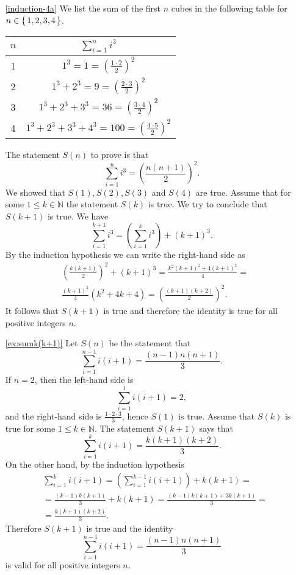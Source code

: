 \begin{enumerate}
\item[\ref{induction-4a}] We list the sum of the first $n$ cubes in the following table for $n\in\left\{\,1,2,3,4\,\right\}$. 
\begin{center}
\begin{tabular}{|c|c|}
\hline
$n$ & $\sum_{i=1}^n i^3$\\
\hline
1 & $1^3=1=\left(\frac{1\cdot 2}{2}\right)^2$\\
\hline
2 & $1^3+2^3=9=\left(\frac{2\cdot 3}{2}\right)^2$\\
\hline
3 & $1^3+2^3+3^3=36=\left(\frac{3\cdot 4}{2}\right)^2$\\
\hline
4 & $1^3+2^3+3^3+4^3=100=\left(\frac{4\cdot 5}{2}\right)^2$\\
\hline
\end{tabular}
\end{center}
The statement $S(n)$ to prove is that 
$$
\sum_{i=1}^n i^3=\left(\frac{n(n+1)}{2}\right)^2.
$$
We showed that $S(1),S(2),S(3)$ and $S(4)$ are true. Assume that for some $1\leq k\in\mathbb{N}$ the statement $S(k)$ is true. We try to conclude that $S(k+1)$ is true.
We have 
$$
\sum_{i=1}^{k+1} i^3= \left(\sum_{i=1}^{k} i^3\right)+(k+1)^3.
$$
By the induction hypothesis we can write the right-hand side as
\begin{align*}
& \left(\frac{k(k+1)}{2}\right)^2+(k+1)^3=\frac{k^2(k+1)^2+4(k+1)^3}{4}=\\
& \frac{(k+1)^2}{4}(k^2+4k+4)=\left(\frac{(k+1)(k+2)}{2}\right)^2.
\end{align*}
It follows that $S(k+1)$ is true and therefore the identity is true for all positive integers $n$.

\item[\ref{ex:sumk(k+1)}]
Let $S(n)$ be the statement that 
\[
\sum_{i=1}^{n-1}{i(i+1)}=\frac{\left(n-1\right)n\left(n+1\right)}{3}.
\]
If $n=2$, then the left-hand side is
\[
\sum_{i=1}^1{i(i+1)}={2}, 
\]
and the right-hand side is $\frac{1\cdot 2 \cdot 3}{3}$, hence $S(1)$ is true. Assume that $S(k)$ is true for some $1\leq k\in\mathbb{N}$.
The statement $S(k+1)$ says that
\[
\sum_{i=1}^{k}{i(i+1)}=\frac{k\left(k+1\right)\left(k+2\right)}{3}.
\]
On the other hand, by the induction hypothesis
\begin{align*}
& \sum_{i=1}^{k}{i(i+1)}=\left(\sum_{i=1}^{k-1}{i(i+1)}\right)+{k(k+1)}=\\
& =\frac{\left(k-1\right)k\left(k+1\right)}{3}+{k(k+1)}=\frac{\left(k-1\right)k\left(k+1\right)+3k(k+1)}{3}=\\
& =\frac{k\left(k+1\right)\left(k+2\right)}{3}.
\end{align*}
Therefore $S(k+1)$ is true and the identity
\[
\sum_{i=1}^{n-1} {i(i+1)}=\frac{\left(n-1\right)n\left(n+1\right)}{3}
\]
is valid for all positive integers $n$.



\end{enumerate}
